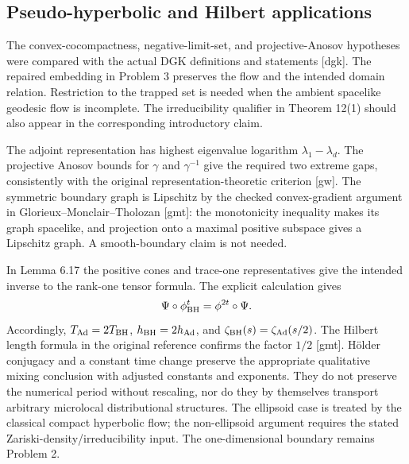 \documentclass[10pt]{article}
\begin{document}
\subsection*{Pseudo-hyperbolic and Hilbert applications}
The convex-cocompactness, negative-limit-set, and projective-Anosov hypotheses were compared with the actual DGK definitions and statements [dgk]. The repaired embedding in Problem 3 preserves the flow and the intended domain relation. Restriction to the trapped set is needed when the ambient spacelike geodesic flow is incomplete. The irreducibility qualifier in Theorem 12(1) should also appear in the corresponding introductory claim.\par
The adjoint representation has highest eigenvalue logarithm \(\lambda_1-\lambda_d\). The projective Anosov bounds for \(\gamma\) and \(\gamma^{-1}\) give the required two extreme gaps, consistently with the original representation-theoretic criterion [gw]. The symmetric boundary graph is Lipschitz by the checked convex-gradient argument in Glorieux–Monclair–Tholozan [gmt]: the monotonicity inequality makes its graph spacelike, and projection onto a maximal positive subspace gives a Lipschitz graph. A smooth-boundary claim is not needed.\par
In Lemma 6.17 the positive cones and trace-one representatives give the intended inverse to the rank-one tensor formula. The explicit calculation gives \[\Psi\circ\phi_{\rm BH}^t=\phi^{2t}\circ\Psi.\] Accordingly, \(T_{\rm Ad}=2T_{\rm BH}\), \(h_{\rm BH}=2h_{\rm Ad}\), and \(\zeta_{\rm BH}(s)=\zeta_{\rm Ad}(s/2)\). The Hilbert length formula in the original reference confirms the factor \(1/2\) [gmt]. Hölder conjugacy and a constant time change preserve the appropriate qualitative mixing conclusion with adjusted constants and exponents. They do not preserve the numerical period without rescaling, nor do they by themselves transport arbitrary microlocal distributional structures. The ellipsoid case is treated by the classical compact hyperbolic flow; the non-ellipsoid argument requires the stated Zariski-density/irreducibility input. The one-dimensional boundary remains Problem 2.\par
\end{document}
